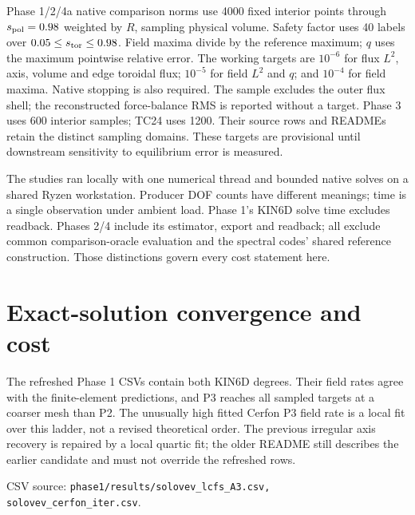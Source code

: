 \documentclass[10pt,a4paper]{article}
\newcommand{\dataref}[1]{{\footnotesize CSV source: \texttt{#1}}}
\newcommand{\pageheading}[1]{\clearpage\section{#1}}
\begin{document}
Phase 1/2/4a native comparison norms use 4000 fixed interior points through $s_{\rm pol}=0.98$
weighted by $R$, sampling physical volume. Safety factor uses 40 labels over
$0.05\leq s_{\rm tor}\leq0.98$. Field maxima divide by the reference maximum; $q$ uses the
maximum pointwise relative error. The working targets are $10^{-6}$ for flux
$L^2$, axis, volume and edge toroidal flux; $10^{-5}$ for field $L^2$ and $q$;
and $10^{-4}$ for field maxima. Native stopping is also required. The sample
excludes the outer flux shell; the reconstructed force-balance RMS is reported
without a target. Phase 3 uses 600 interior samples; TC24 uses 1200.
Their source rows and READMEs retain the distinct sampling domains. These targets are provisional until downstream sensitivity
to equilibrium error is measured.

The studies ran locally with one numerical thread and bounded native solves
on a shared Ryzen workstation. Producer DOF counts have different meanings;
time is a single observation under ambient load. Phase 1's KIN6D solve time
excludes readback. Phases 2/4 include its estimator, export and readback; all
exclude common comparison-oracle evaluation and the spectral codes' shared
reference construction. Those distinctions govern every cost statement here.

\pageheading{Exact-solution convergence and cost}
The refreshed Phase 1 CSVs contain both KIN6D degrees. Their field rates agree
with the finite-element predictions, and P3 reaches all sampled targets at a
coarser mesh than P2. The unusually high fitted Cerfon P3 field rate is a local
fit over this ladder, not a revised theoretical order. The previous irregular
axis recovery is repaired by a local quartic fit; the older README still
describes the earlier candidate and must not override the refreshed rows.

\begin{center}\small

\end{center}
\dataref{phase1/results/solovev\_lcfs\_A3.csv, solovev\_cerfon\_iter.csv}.
\end{document}
